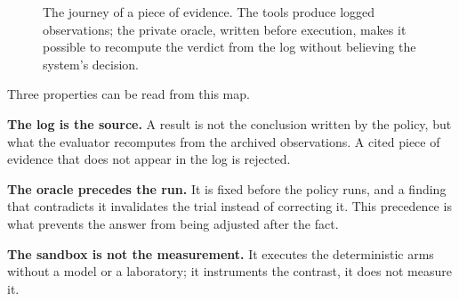 \begin{figure}[H]
\centering
{}
\caption{The journey of a piece of evidence. The tools produce logged
observations; the private oracle, written before execution, makes it possible to
recompute the verdict from the log without believing the system's decision.}
\label{fig:tripwire}
\end{figure}

Three properties can be read from this map.

\textbf{The log is the source.} A result is not the conclusion written by the
policy, but what the evaluator recomputes from the archived observations. A cited
piece of evidence that does not appear in the log is rejected.

\textbf{The oracle precedes the run.} It is fixed before the policy runs, and a
finding that contradicts it invalidates the trial instead of correcting it. This
precedence is what prevents the answer from being adjusted after the fact.

\textbf{The sandbox is not the measurement.} It executes the deterministic arms
without a model or a laboratory; it instruments the contrast, it does not measure
it.

